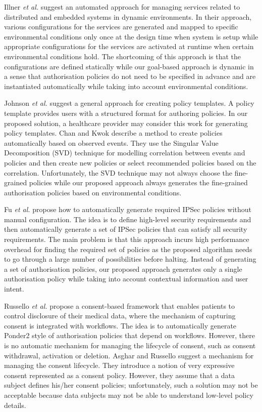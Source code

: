 \documentclass[10pt, conference, compsocconf]{IEEEtran}
\begin{document}
Illner \emph{et al.} \cite{Illner2005-PDCN, Illner2005-INDIN} suggest an automated approach for managing services related to distributed and embedded systems in dynamic environments. In their approach, various configurations for the services are generated and mapped to specific environmental conditions only once at the design time when system is setup while appropriate configurations for the services are activated at runtime when certain environmental conditions hold. The shortcoming of this approach is that the configurations are defined statically while our goal-based approach is dynamic in a sense that authorisation policies do not need to be specified in advance and are instantiated automatically while taking into account environmental conditions.



Johnson \emph{et al.} \cite{Johnson2010} suggest a general approach for creating policy templates. A policy template provides users with a structured format for authoring policies. In our proposed solution, a healthcare provider may consider this work for generating policy templates. Chan and Kwok \cite{Chan2006} describe a method to create policies automatically based on observed events. They use the Singular Value Decomposition (SVD) technique for modelling correlation between events and policies and then create new policies or select recommended policies based on the correlation. Unfortunately, the SVD technique may not always choose the fine-grained policies while our proposed approach always generates the fine-grained authorisation policies based on environmental conditions.

Fu \emph{et al.} \cite{Fu2001, Fu2001-phdthesis} propose how to automatically generate required IPSec policies without manual configuration. The idea is to define high-level security requirements and then automatically generate a set of IPSec policies that can satisfy all security requirements. The main problem is that this approach incurs high performance overhead for finding the required set of policies as the proposed algorithm needs to go through a large number of possibilities before halting. Instead of generating a set of authorisation policies, our proposed approach generates only a single authorisation policy while taking into account contextual information and user intent.


Russello \emph{et al.} \cite{Russello2008} propose a consent-based framework that enables patients to control disclosure of their medical data, where the mechanism of capturing consent is integrated with workflows. The idea is to automatically generate Ponder2 style of authorisation policies \cite{Damianou2001} that depend on workflows. However, there is no automatic mechanism for managing the lifecycle of consent, such as consent withdrawal, activation or deletion. Asghar and Russello \cite{Asghar2011} suggest a mechanism for managing the consent lifecycle. They introduce a notion of very expressive consent represented as a consent policy. However, they assume that a data subject defines his/her consent policies; unfortunately, such a solution may not be acceptable because data subjects may not be able to understand low-level policy details.
\end{document}
